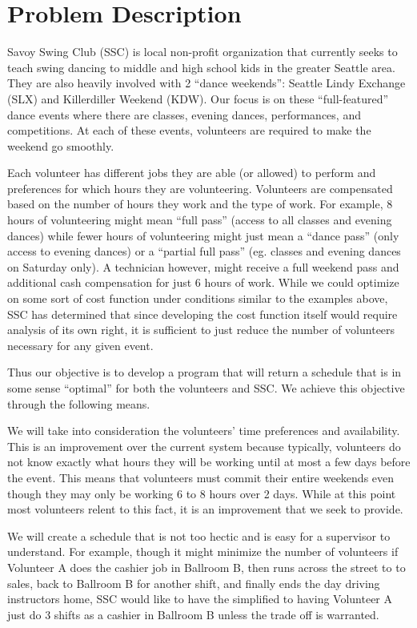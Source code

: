 \documentclass[11pt]{article}
\theoremstyle{definition}
\begin{document}
\section{Problem Description}
\begin{multicols}{2}
Savoy Swing Club (SSC) is local non-profit organization that currently seeks to teach swing dancing to middle and high school kids in the greater Seattle area.
They are also heavily involved with 2 ``dance weekends'': Seattle Lindy Exchange (SLX) and Killerdiller Weekend (KDW). Our focus is on these ``full-featured'' dance events where there are classes, evening dances, performances, and competitions.
At each of these events, volunteers are required to make the weekend go smoothly.

Each volunteer has different jobs they are able (or allowed) to perform and preferences for which hours they are volunteering.
Volunteers are compensated based on the number of hours they work and the type of work.
For example, 8 hours of volunteering might mean “full pass” (access to all classes and evening dances) while fewer hours of volunteering might just mean a “dance pass” (only access to evening dances) or a “partial full pass” (eg. classes and evening dances on Saturday only).
A technician however, might receive a full weekend pass and additional cash compensation for just 6 hours of work.
While we could optimize on some sort of cost function under conditions similar to the examples above, SSC has determined that since developing the cost function itself would require analysis of its own right, it is sufficient to just reduce the number of volunteers necessary for any given event.

Thus our objective is to develop a program that will return a schedule that is in some sense ``optimal'' for both the volunteers and SSC.
We achieve this objective through the following means.

We will take into consideration the volunteers' time preferences and availability.
This is an improvement over the current system because typically, volunteers do not know exactly what hours they will be working until at most a few days before the event.
This means that volunteers must commit their entire weekends even though they may only be working 6 to 8 hours over 2 days.
While at this point most volunteers relent to this fact, it is an improvement that we seek to provide.

We will create a schedule that is not too hectic and is easy for a supervisor to understand.
For example, though it might minimize the number of volunteers if Volunteer A does the cashier job in Ballroom B, then runs across the street to to sales, back to Ballroom B for another shift, and finally ends the day driving instructors home, SSC would like to have the simplified to having Volunteer A just do 3 shifts as a cashier in Ballroom B unless the trade off is warranted.


\end{multicols}
\end{document}
